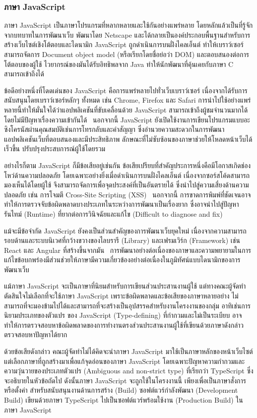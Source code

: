 \documentclass[12pt,one side,openright,a4paper]{cpe-thesis-th}
\newcommand{\thaijustify}[1]{%
  \par\hspace{30pt}\justifying
  #1
}
\begin{document}
\subsubsection{ภาษา JavaScript}
\thaijustify{
  ภาษา JavaScript เป็นภาษาโปรแกรมที่หลากหลายและใช้กันอย่างแพร่หลาย โดยหลักแล้วเป็นที่รู้จักจากบทบาทในการพัฒนาเว็บ พัฒนาโดย Netscape และได้กลายเป็นองค์ประกอบพื้นฐานสำหรับการสร้างเว็บไซต์เชิงโต้ตอบและไดนามิก JavaScript ถูกดำเนินการบนฝั่งไคลเอ็นต์ ทำให้เบราว์เซอร์สามารถจัดการ Document object model (หรือเรียกโดยชื่อย่อว่า DOM) และตอบสนองต่อการโต้ตอบของผู้ใช้ ไวยากรณ์ของมันได้รับอิทธิพลจาก Java ทำให้นักพัฒนาที่คุ้นเคยกับภาษา C สามารถเข้าถึงได้~\cite{flanagan20js}
}
\thaijustify{
  ข้อดีอย่างหนึ่งที่โดดเด่นของ JavaScript คือการแพร่หลายไปทั่วเว็บเบราว์เซอร์ เนื่องจากได้รับการสนับสนุนโดยเบราว์เซอร์หลักๆ ทั้งหมด เช่น Chrome, Firefox และ Safari การนำไปใช้อย่างแพร่หลายนี้ทำให้มั่นใจได้ว่าแอปพลิเคชันที่ขับเคลื่อนด้วย JavaScript สามารถเข้าถึงผู้ชมจำนวนมากได้โดยไม่มีปัญหาเรื่องความเข้ากันได้~\cite{flanagan20js} นอกจากนี้ JavaScript ยังเปิดใช้งานการเขียนโปรแกรมแบบอะซิงโครนัสผ่านคุณสมบัติเช่นการโทรกลับและคำสัญญา ซึ่งอำนวยความสะดวกในการพัฒนาแอปพลิเคชันเว็บที่ตอบสนองและมีประสิทธิภาพ ลักษณะที่ไม่ซับซ้อนของภาษาช่วยให้โหลดหน้าเว็บได้เร็วขึ้น ปรับปรุงประสบการณ์ผู้ใช้โดยรวม~\cite{crockford08js}
}
\thaijustify{
  อย่างไรก็ตาม JavaScript ก็มีข้อเสียอยู่เช่นกัน ข้อเสียเปรียบที่สำคัญประการหนึ่งคือมีโอกาสเกิดช่องโหว่ด้านความปลอดภัย โดยเฉพาะอย่างยิ่งเมื่อดำเนินการบนฝั่งไคลเอ็นต์ เนื่องจากซอร์สโค้ดสามารถมองเห็นได้โดยผู้ใช้ จึงสามารถจัดการเพื่อจุดประสงค์ที่เป็นอันตรายได้ ซึ่งนำไปสู่ความเสี่ยงด้านความปลอดภัย เช่น การโจมตี Cross-Site Scripting (XSS)~\cite{flanagan20js} นอกจากนี้ การขาดการพิมพ์ที่ชัดเจนอาจทำให้การตรวจจับข้อผิดพลาดบางประเภทในระหว่างการพัฒนาเป็นเรื่องยาก ซึ่งอาจนำไปสู่ปัญหารันไทม์ (Runtime) ที่ยากต่อการวินิจฉัยและแก้ไข (Difficult to diagnose and fix)~\cite{crockford08js}
}
\thaijustify{
  แม้จะมีข้อจำกัด JavaScript ยังคงเป็นส่วนสำคัญของการพัฒนาเว็บยุคใหม่ เนื่องจากความสามารถรอบด้านและระบบนิเวศที่กว้างขวางของไลบรารี (Library) และเฟรมเวิร์ก (Framework) เช่น React และ Angular ที่สร้างขึ้นจากมัน~\cite{flanagan20js} การพัฒนาอย่างต่อเนื่องของภาษาและความพยายามในการแก้ไขข้อบกพร่องมีส่วนช่วยให้ภาษามีความเกี่ยวข้องอย่างต่อเนื่องในภูมิทัศน์แบบไดนามิกของการพัฒนาเว็บ~\cite{crockford08js}
}
\thaijustify{
  แม้ภาษา JavaScript จะเป็นภาษาที่นิยมสำหรับการเขียนส่วนประสานงานผู้ใช้ แต่ทางคณะผู้จัดทำตัดสินใจไม่เลือกที่จะใช้ภาษา JavaScript เพราะข้อผิดพลาดและข้อเสียของภาษาหลายอย่าง ไม่สามารถที่จะมองข้ามไปได้และสามารถที่จะสร้างเป็นอุปสรรคสำหรับงานโครงงานของกลุ่ม อาทิเช่นการนิยามประเภทของตัวแปร ของ JavaScript (Type-defining) ที่กำกวมและไม่เป็นระเบียบ อาจทำให้การตรวจสอบหาข้อผิดพลาดของการทำงานตรงส่วนประสานงานผู้ใช้ที่เขียนด้วยภาษาดังกล่าว ตรวจสอบหาปัญหาได้ยาก
}
\thaijustify{
  ด้วยข้อเสียดังกล่าว คณะผู้จัดทำไม่ได้คิดจะนำภาษา JavaScript มาใช้เป็นภาษาหลักของหน้าเว็บไซต์ แต่เลือกภาษาที่ถูกสร้างมาเพื่อแก้จุดอ่อนของภาษา JavaScript โดยเฉพาะปัญหาความกำกวมและความวุ่นวายของประเภทตัวแปร (Ambiguous and non-strict type) ที่เรียกว่า TypeScript ซึ่งจะอธิบายในหัวข้อถัดไป ดังนั้นภาษา JavaScript จะถูกใช้ในโครงงานนี้ เพียงเพื่อเป็นภาษาสั่งการหรือตั้งค่า สำหรับสนับสนุนงานด้านการสร้าง (Build) ซอฟต์แวร์กำลังพัฒนา (Development Build) เขียนด้วยภาษา TypeScript ไปเป็นซอฟต์แวร์พร้อมใช้งาน (Production Build) ในภาษา JavaScript
}
\end{document}

